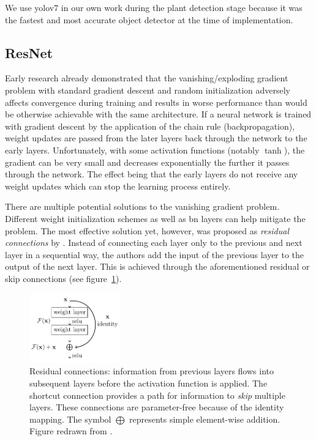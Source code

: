 \documentclass[draft,final]{vutinfth} %
\begin{document}
We use \gls{yolo}v7 in our own work during the plant detection stage
because it was the fastest and most accurate object detector at the
time of implementation.

\subsection{ResNet}
\label{sec:methods-classification}

Early research \cite{bengio1994,glorot2010} already demonstrated that
the vanishing/exploding gradient problem with standard gradient
descent and random initialization adversely affects convergence during
training and results in worse performance than would be otherwise
achievable with the same architecture. If a neural network is trained
with gradient descent by the application of the chain rule
(backpropagation), weight updates are passed from the later layers
back through the network to the early layers. Unfortunately, with some
activation functions (notably $\tanh$), the gradient can be very small
and decreases exponentially the further it passes through the
network. The effect being that the early layers do not receive any
weight updates which can stop the learning process entirely.

There are multiple potential solutions to the vanishing gradient
problem. Different weight initialization schemes
\cite{glorot2010,sussillo2015} as well as \gls{bn} layers
\cite{ioffe2015} can help mitigate the problem. The most effective
solution yet, however, was proposed as \emph{residual connections} by
\textcite{he2016}. Instead of connecting each layer only to the
previous and next layer in a sequential way, the authors add the input
of the previous layer to the output of the next layer. This is
achieved through the aforementioned residual or skip connections (see
figure~\ref{fig:residual-connection}).

\begin{figure}
  \centering
  \includegraphics[width=0.35\textwidth]{graphics/residual-connection/res.pdf}
  \caption[Residual connection]{Residual connections: information from
    previous layers flows into subsequent layers before the activation
    function is applied. The shortcut connection provides a path for
    information to \emph{skip} multiple layers. These connections are
    parameter-free because of the identity mapping. The symbol
    $\bigoplus$ represents simple element-wise addition. Figure
    redrawn from \textcite{he2016}.}
  \label{fig:residual-connection}
\end{figure}
\end{document}
